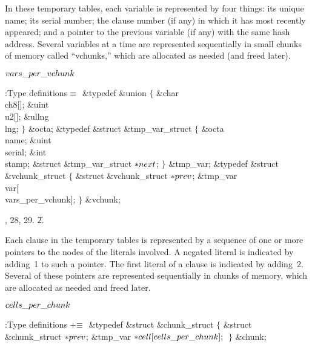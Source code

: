 In these temporary tables, each variable is represented by four things:
its unique name; its serial number; the clause number (if any) in which it has
most recently appeared; and a pointer to the previous variable (if any)
with the same hash address. Several variables at a time
are represented sequentially in small chunks of memory called ``vchunks,''
which are allocated as needed (and freed later).

\Y\B\4\D$\\{vars\_per\_vchunk}$ \5
\par
\Y\B\4:Type definitions\X${}\equiv{}$\6
\&{typedef} \&{union} ${}\{{}$\1\6
\&{char} \\{ch8}[];\6
\&{uint} \\{u2}[];\6
\&{ullng} \\{lng};\2\6
${}\}{}$ \&{octa};\6
\&{typedef} \&{struct} \&{tmp\_var\_struct} ${}\{{}$\1\6
\&{octa} \\{name};\6
\&{uint} \\{serial};\6
\&{int} \\{stamp};\6
\&{struct} \&{tmp\_var\_struct} ${}{*}\\{next}{}$;\2%
\6
${}\}{}$ \&{tmp\_var};\7
\&{typedef} \&{struct} \&{vchunk\_struct} ${}\{{}$\1\6
\&{struct} \&{vchunk\_struct} ${}{*}\\{prev}{}$;\6
\&{tmp\_var} \\{var}[\\{vars\_per\_vchunk}];\2\6
${}\}{}$ \&{vchunk};\par
{}, 28, 29.
\U2.\fi

Each clause in the temporary tables is represented by a sequence of
one or more pointers to the  nodes of the literals involved.
A negated literal is indicated by adding~1 to such a pointer.
The first literal of a clause is indicated by adding~2.
Several of these pointers are represented sequentially in chunks
of memory, which are allocated as needed and freed later.

\Y\B\4\D$\\{cells\_per\_chunk}$ \5
\par
\Y\B\4:Type definitions\X${}\mathrel+\equiv{}$\6
\&{typedef} \&{struct} \&{chunk\_struct} ${}\{{}$\1\6
\&{struct} \&{chunk\_struct} ${}{*}\\{prev}{}$;\6
\&{tmp\_var} ${}{*}\\{cell}[\\{cells\_per\_chunk}];{}$\2\6
${}\}{}$ \&{chunk};\par
\fi

